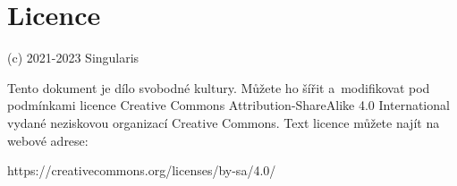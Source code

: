 \section{Licence}

\noindent (c) 2021-2023 Singularis

Tento dokument je dílo svobodné kultury. Můžete ho šířit a modifikovat pod
podmínkami licence Creative Commons Attribution-ShareAlike 4.0 International
vydané neziskovou organizací Creative Commons. Text licence
můžete najít na webové adrese:

https://creativecommons.org/licenses/by-sa/4.0/


